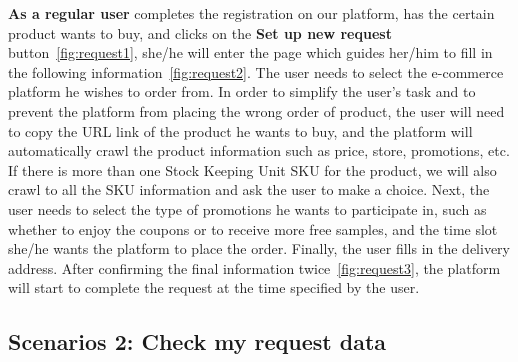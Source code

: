 \textbf{As a regular user} completes the registration on our platform, has the certain product wants to buy, and clicks on the \textbf{Set up new request} button~\ref{fig:request1}, she/he will enter the page which guides her/him to fill in the following information~\ref{fig:request2}. The user needs to select the e-commerce platform he wishes to order from. In order to simplify the user's task and to prevent the platform from placing the wrong order of product, the user will need to copy the URL link of the product he wants to buy, and the platform will automatically crawl the product information such as price, store, promotions, etc. If there is more than one Stock Keeping Unit SKU for the product, we will also crawl to all the SKU information and ask the user to make a choice. Next, the user needs to select the type of promotions he wants to participate in, such as whether to enjoy the coupons or to receive more free samples, and the time slot she/he wants the platform to place the order. Finally, the user fills in the delivery address. After confirming the final information twice~\ref{fig:request3}, the platform will start to complete the request at the time specified by the user.

\subsection{Scenarios 2: Check my request data}

